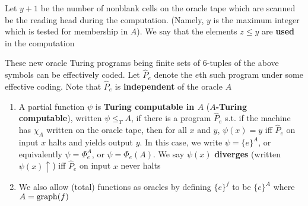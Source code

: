 \documentclass[11pt]{article}
\begin{document}
\begin{center}
\end{center}


Let \(y+1\) be the number of nonblank cells on the oracle tape which are
scanned be the reading head during the computation. (Namely, \(y\) is the
maximum integer which is tested for membership in \(A\)). We say that the
elements \(z\le y\) are \textbf{used} in the computation

These new oracle Turing programs being finite sets of 6-tuples of the above
symbols can be effectively coded. Let \(\widehat{P}_e\) denote the \(e\)th
such program under some effective coding. Note that \(\widehat{P}_e\) is
\textbf{independent} of the oracle \(A\)

\begin{definition}[]
\begin{enumerate}
\item A partial function \(\psi\) is \textbf{Turing computable in \(A\)} (\textbf{\(A\)-Turing
computable}), written \(\psi\le_T A\), if there is a program
\(\widehat{P}_e\) s.t. if the machine has \(\chi_A\) written on the oracle
tape, then for all \(x\) and \(y\), \(\psi(x)=y\) iff \(\widehat{P}_e\) on
input \(x\) halts and yields output \(y\). In this case, we write
\(\psi=\{e\}^A\), or equivalently \(\psi=\Phi_e^A\), or
\(\psi=\Phi_e(A)\). We say \(\psi(x)\) \textbf{diverges} (written
\(\psi(x)\uparrow\)) iff \(\widehat{P}_e\) on input \(x\) never halts
\item We also allow (total) functions as oracles by defining \(\{e\}^f\) to be
\(\{e\}^A\) where \(A=\operatorname{graph}(f)\)
\end{enumerate}
\end{definition}
\end{document}
